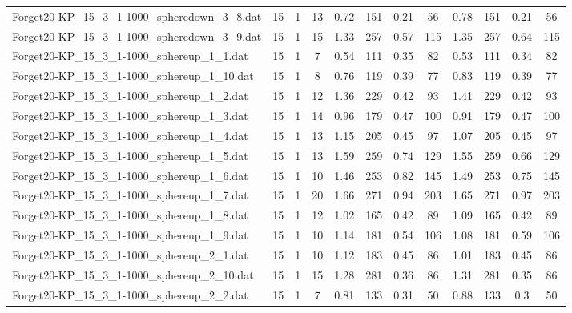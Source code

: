 \begin{sidewaystable}[!ht]
{\begin{tabular}{lccccccccccc}
Forget20-KP\_15\_3\_1-1000\_spheredown\_3\_8.dat & 15 & 1 & 13 & 0.72 & 151 &  \textcolor{blue2}{0.21} & 56 & 0.78 & 151 &  \textcolor{blue2}{0.21} & 56 \\
Forget20-KP\_15\_3\_1-1000\_spheredown\_3\_9.dat & 15 & 1 & 15 & 1.33 & 257 &  \textcolor{blue2}{0.57} & 115 & 1.35 & 257 & 0.64 & 115 \\
Forget20-KP\_15\_3\_1-1000\_sphereup\_1\_1.dat & 15 & 1 & 7 & 0.54 & 111 & 0.35 & 82 & 0.53 & 111 &  \textcolor{blue2}{0.34} & 82 \\
Forget20-KP\_15\_3\_1-1000\_sphereup\_1\_10.dat & 15 & 1 & 8 & 0.76 & 119 &  \textcolor{blue2}{0.39} & 77 & 0.83 & 119 &  \textcolor{blue2}{0.39} & 77 \\
Forget20-KP\_15\_3\_1-1000\_sphereup\_1\_2.dat & 15 & 1 & 12 & 1.36 & 229 &  \textcolor{blue2}{0.42} & 93 & 1.41 & 229 &  \textcolor{blue2}{0.42} & 93 \\
Forget20-KP\_15\_3\_1-1000\_sphereup\_1\_3.dat & 15 & 1 & 14 & 0.96 & 179 &  \textcolor{blue2}{0.47} & 100 & 0.91 & 179 &  \textcolor{blue2}{0.47} & 100 \\
Forget20-KP\_15\_3\_1-1000\_sphereup\_1\_4.dat & 15 & 1 & 13 & 1.15 & 205 &  \textcolor{blue2}{0.45} & 97 & 1.07 & 205 &  \textcolor{blue2}{0.45} & 97 \\
Forget20-KP\_15\_3\_1-1000\_sphereup\_1\_5.dat & 15 & 1 & 13 & 1.59 & 259 & 0.74 & 129 & 1.55 & 259 &  \textcolor{blue2}{0.66} & 129 \\
Forget20-KP\_15\_3\_1-1000\_sphereup\_1\_6.dat & 15 & 1 & 10 & 1.46 & 253 & 0.82 & 145 & 1.49 & 253 &  \textcolor{blue2}{0.75} & 145 \\
Forget20-KP\_15\_3\_1-1000\_sphereup\_1\_7.dat & 15 & 1 & 20 & 1.66 & 271 &  \textcolor{blue2}{0.94} & 203 & 1.65 & 271 & 0.97 & 203 \\
Forget20-KP\_15\_3\_1-1000\_sphereup\_1\_8.dat & 15 & 1 & 12 & 1.02 & 165 &  \textcolor{blue2}{0.42} & 89 & 1.09 & 165 &  \textcolor{blue2}{0.42} & 89 \\
Forget20-KP\_15\_3\_1-1000\_sphereup\_1\_9.dat & 15 & 1 & 10 & 1.14 & 181 &  \textcolor{blue2}{0.54} & 106 & 1.08 & 181 & 0.59 & 106 \\
Forget20-KP\_15\_3\_1-1000\_sphereup\_2\_1.dat & 15 & 1 & 10 & 1.12 & 183 &  \textcolor{blue2}{0.45} & 86 & 1.01 & 183 &  \textcolor{blue2}{0.45} & 86 \\
Forget20-KP\_15\_3\_1-1000\_sphereup\_2\_10.dat & 15 & 1 & 15 & 1.28 & 281 & 0.36 & 86 & 1.31 & 281 &  \textcolor{blue2}{0.35} & 86 \\
Forget20-KP\_15\_3\_1-1000\_sphereup\_2\_2.dat & 15 & 1 & 7 & 0.81 & 133 & 0.31 & 50 & 0.88 & 133 &  \textcolor{blue2}{0.3} & 50 \\

\end{tabular}}
\end{sidewaystable}
